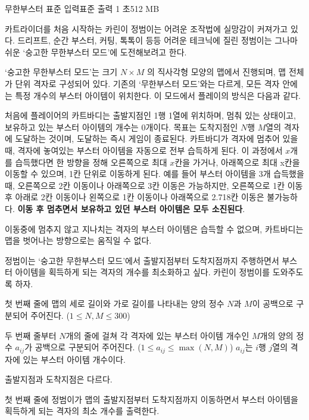 \begin{problem}{무한부스터}
    {표준 입력}{표준 출력}
    {1 초}{512 MB}{}
    
    카트라이더를 처음 시작하는 카린이 정범이는 어려운 조작법에 실망감이 커져가고 있다. 드리프트, 순간 부스터, 커팅, 톡톡이 등등 어려운 테크닉에 질린 정범이는 그나마 쉬운 `숭고한 무한부스터 모드'에 도전해보려고 한다.
    
    `숭고한 무한부스터 모드'는 크기 $ N \times M $ 의 직사각형 모양의 맵에서 진행되며, 맵 전체가 단위 격자로 구성되어 있다. 기존의 `무한부스터 모드'와는 다르게, 모든 격자 안에는 특정 개수의 부스터 아이템이 위치한다. 이 모드에서 플레이의 방식은 다음과 같다.
    
    처음에 플레이어의 카트바디는 출발지점인 1행 1열에 위치하며, 멈춰 있는 상태이고, 보유하고 있는 부스터 아이템의 개수는 0개이다. 목표는 도착지점인 $ N $행 $ M $열의 격자에 도달하는 것이며, 도달하는 즉시 게임이 종료된다. 카트바디가 격자에 멈추어 있을 때, 격자에 놓여있는 부스터 아이템을 자동으로 전부 습득하게 된다. 이 과정에서 $ x $개를 습득했다면 한 방향을 정해 오른쪽으로 최대 $ x $칸을 가거나, 아래쪽으로 최대 x칸을 이동할 수 있으며, 1칸 단위로 이동하게 된다. 예를 들어 부스터 아이템을 3개 습득했을 때, 오른쪽으로 2칸 이동이나 아래쪽으로 3칸 이동은 가능하지만, 오른쪽으로 1칸 이동 후 아래로 2칸 이동이나 왼쪽으로 1칸 이동이나 아래쪽으로 2.718칸 이동은 불가능하다. \textbf{이동 후 멈추면서 보유하고 있던 부스터 아이템은 모두 소진된다}.
    
    이동중에 멈추지 않고 지나치는 격자의 부스터 아이템은 습득할 수 없으며, 카트바디는 맵을 벗어나는 방향으로는 움직일 수 없다.
    
    정범이는 `숭고한 무한부스터 모드'에서 출발지점부터 도착지점까지 주행하면서 부스터 아이템을 획득하게 되는 격자의 개수를 최소화하고 싶다. 카린이 정범이를 도와주도록 하자.
    
    
    \InputFile
    
    
    첫 번째 줄에 맵의 세로 길이와 가로 길이를 나타내는 양의 정수 $ N $과 $ M $이 공백으로 구분되어 주어진다. ($ 1 \leq N, M \leq 300 $)
    
    두 번째 줄부터 $ N$개의 줄에 걸쳐 각 격자에 있는 부스터 아이템 개수인 $ M $개의 양의 정수 $ a_{ij} $가 공백으로 구분되어 주어진다. ($ 1 \leq a_{ij} \leq \max(N, M) $) $ a_{ij} $는 $ i $행 $ j $열의 격자에 있는 부스터 아이템 개수이다.
    
    출발지점과 도착지점은 다르다.
    
    
    \OutputFile
    첫 번째 줄에 정범이가 맵의 출발지점부터 도착지점까지 이동하면서 부스터 아이템을 획득하게 되는 격자의 최소 개수를 출력한다.
    

\end{problem}
